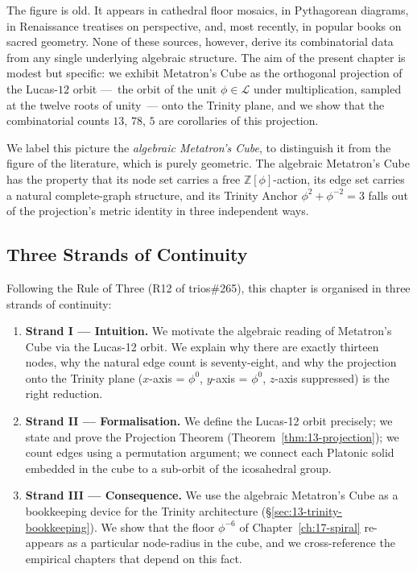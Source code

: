 The figure is old. It appears in cathedral floor mosaics, in
Pythagorean diagrams, in Renaissance treatises on perspective, and,
most recently, in popular books on sacred geometry. None of these
sources, however, derive its combinatorial data from any single
underlying algebraic structure. The aim of the present chapter is
modest but specific: we exhibit Metatron's Cube as the orthogonal
projection of the Lucas-$12$ orbit ---~the orbit of the unit
$\phi \in \mathcal{L}$ under multiplication, sampled at the twelve
roots of unity~--- onto the Trinity plane, and we show that the
combinatorial counts $13$, $78$, $5$ are corollaries of this
projection.

We label this picture the \emph{algebraic Metatron's Cube}, to
distinguish it from the figure of the literature, which is purely
geometric. The algebraic Metatron's Cube has the property that its
node set carries a free $\mathbb{Z}[\phi]$-action, its edge set
carries a natural complete-graph structure, and its Trinity Anchor
$\phi^{2} + \phi^{-2} = 3$ falls out of the projection's metric
identity in three independent ways.

\subsection{Three Strands of Continuity}
\label{sec:13-three-strands}

Following the Rule of Three (R12 of trios\#265), this chapter is
organised in three strands of continuity:

\begin{enumerate}
\item \textbf{Strand I --- Intuition.} We motivate the algebraic
  reading of Metatron's Cube via the Lucas-12 orbit. We explain why
  there are exactly thirteen nodes, why the natural edge count is
  seventy-eight, and why the projection onto the Trinity plane
  ($x$-axis = $\phi^{0}$, $y$-axis = $\phi^{0}$, $z$-axis suppressed)
  is the right reduction.
\item \textbf{Strand II --- Formalisation.} We define the Lucas-12
  orbit precisely; we state and prove the Projection Theorem
  (Theorem~\ref{thm:13-projection}); we count edges using a
  permutation argument; we connect each Platonic solid embedded in
  the cube to a sub-orbit of the icosahedral group.
\item \textbf{Strand III --- Consequence.} We use the algebraic
  Metatron's Cube as a bookkeeping device for the Trinity
  architecture (\S\ref{sec:13-trinity-bookkeeping}). We show that
  the floor $\phi^{-6}$ of Chapter~\ref{ch:17-spiral} re-appears as
  a particular node-radius in the cube, and we cross-reference the
  empirical chapters that depend on this fact.
\end{enumerate}

